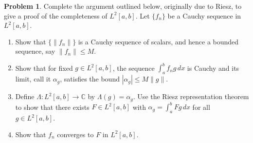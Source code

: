 \documentclass[12pt]{article}
\theoremstyle{definition}
\newtheorem{ex}{Problem}
\begin{document}
\begin{ex}
	Complete the argument outlined below, originally due to Riesz, to give a proof of the completeness of $L^2[a, b]$.
	Let $\lbrace f_n \rbrace$ be a Cauchy sequence in $L^2[a, b]$.
	\begin{enumerate}[label=(\alph*)]
		\item Show that $\lbrace \|f_n\| \rbrace$ is a Cauchy sequence of scalars, and hence a bounded sequence, say $\|f_n\| \leq M$.
		\item Show that for fixed $g \in L^2[a, b]$, the sequence $\int_a^b f_ng \, dx$ is Cauchy and its limit, call it $\alpha_g$, satisfies the bound $|\alpha_g| \leq M\|g\|$.
		\item Define $\Lambda : L^2[a, b] \to \mathbb{C}$ by $\Lambda(g) = \alpha_g$.
		      Use the Riesz representation theorem to show that there exists $F \in L^2[a, b]$ with $\alpha_g = \int_a^b Fg \, dx$ for all $g \in L^2[a, b]$.
		\item Show that $f_n$ converges to $F$ in $L^2[a, b]$.
	\end{enumerate}
\end{ex}
\end{document}
